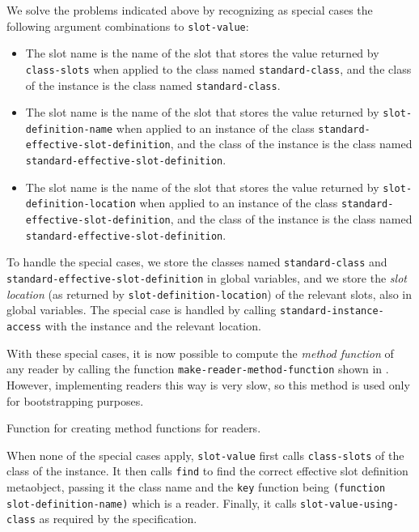 We solve the problems indicated above%
by recognizing as special cases
the following argument combinations to \texttt{slot-value}:

\begin{itemize}
\item The slot name is the name of the slot that stores the value
  returned by \texttt{class-slots} when applied to the class named
  \texttt{standard-class}, and the class of the instance is the class
  named \texttt{standard-class}.
\item The slot name is the name of the slot that stores the value
  returned by \texttt{slot-definition-name} when applied to an
  instance of the class \texttt{standard-effective-slot-definition},
  and the class of the instance is the class named
  \texttt{standard-effective-slot-definition}. 
\item The slot name is the name of the slot that stores the value
  returned by \texttt{slot-definition-location} when applied to an
  instance of the class \texttt{standard-effective-slot-definition},
  and the class of the instance is the class named
  \texttt{standard-effective-slot-definition}. 
\end{itemize}

To handle the special cases, we store the classes named
\texttt{standard-class} and
\texttt{standard-effective-slot-definition} in global variables, and
we store the \emph{slot location} (as returned by
\texttt{slot-definition-location}) of the relevant slots, also in
global variables.  The special case is handled by calling
\texttt{standard-instance-access} with the instance and the relevant
location.

With these special cases, it is now possible to compute the
\emph{method function} of any reader by calling the function
\texttt{make-reader-method-function} shown in
.  However, implementing readers this way is
very slow, so this method is used only for bootstrapping purposes.

\begin{codefragment}
\caption{\label{code-make-reader}
Function for creating method functions for readers.}
\end{codefragment}

When none of the special cases apply, \texttt{slot-value} first calls
\texttt{class-slots} of the class of the instance.  It then calls
\texttt{find} to find the correct effective slot definition
metaobject, passing it the class name and the \texttt{key} function
being \texttt{(function slot-definition-name)} which is a reader.
Finally, it calls \texttt{slot-value-using-class} as required by the
specification.

